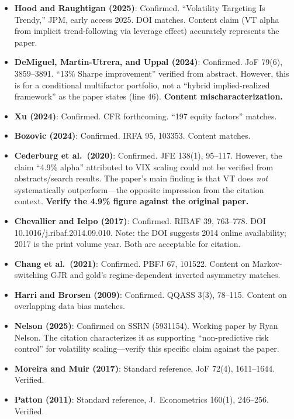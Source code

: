 \documentclass[12pt,a4paper]{article}
\begin{document}
\begin{itemize}[nosep]
\item \textbf{Hood and Raughtigan (2025)}: Confirmed. ``Volatility Targeting Is Trendy,'' JPM, early access 2025. DOI matches. Content claim (VT alpha from implicit trend-following via leverage effect) accurately represents the paper.
\item \textbf{DeMiguel, Martin-Utrera, and Uppal (2024)}: Confirmed. JoF 79(6), 3859--3891. ``13\% Sharpe improvement'' verified from abstract. However, this is for a conditional multifactor portfolio, not a ``hybrid implied-realized framework'' as the paper states (line 46). \textcolor{warncolor}{\textbf{Content mischaracterization.}}
\item \textbf{Xu (2024)}: Confirmed. CFR forthcoming. ``197 equity factors'' matches.
\item \textbf{Bozovic (2024)}: Confirmed. IRFA 95, 103353. Content matches.
\item \textbf{Cederburg et al.\ (2020)}: Confirmed. JFE 138(1), 95--117. However, the claim ``4.9\% alpha'' attributed to VIX scaling could not be verified from abstracts/search results. The paper's main finding is that VT does \textit{not} systematically outperform---the opposite impression from the citation context. \textcolor{warncolor}{\textbf{Verify the 4.9\% figure against the original paper.}}
\item \textbf{Chevallier and Ielpo (2017)}: Confirmed. RIBAF 39, 763--778. DOI 10.1016/j.ribaf.2014.09.010. Note: the DOI suggests 2014 online availability; 2017 is the print volume year. Both are acceptable for citation.
\item \textbf{Chang et al.\ (2021)}: Confirmed. PBFJ 67, 101522. Content on Markov-switching GJR and gold's regime-dependent inverted asymmetry matches.
\item \textbf{Harri and Brorsen (2009)}: Confirmed. QQASS 3(3), 78--115. Content on overlapping data bias matches.
\item \textbf{Nelson (2025)}: Confirmed on SSRN (5931154). Working paper by Ryan Nelson. The citation characterizes it as supporting ``non-predictive risk control'' for volatility scaling---verify this specific claim against the paper.
\item \textbf{Moreira and Muir (2017)}: Standard reference, JoF 72(4), 1611--1644. Verified.
\item \textbf{Patton (2011)}: Standard reference, J.\ Econometrics 160(1), 246--256. Verified.
\end{itemize}
\end{document}

